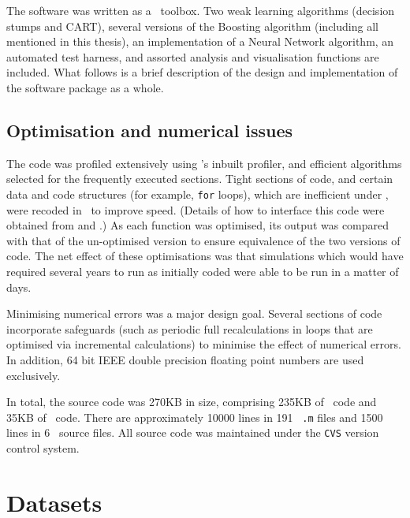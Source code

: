 The software was written as a \MATLAB\ toolbox.  Two weak learning
algorithms (decision stumps and CART), several versions of the
Boosting algorithm (including all mentioned in this thesis), an
implementation of a Neural Network algorithm, an automated test
harness, and assorted analysis and visualisation functions are
included.  What follows is a brief description of the design and
implementation of the software package as a whole.

\subsection{Optimisation and numerical issues}

The code was profiled extensively using \MATLAB's inbuilt profiler,
and efficient algorithms selected for the frequently executed
sections.  Tight sections of code, and certain data and code
structures (for example, {\tt for} loops), which are inefficient under
\MATLAB, were recoded in \C\ to improve speed.  (Details of how
to interface this code were obtained from \cite{MathWorks96} and
\cite{MathWorks96a}.) As each function was optimised, its output was
compared with that of the un-optimised version to ensure equivalence
of the two versions of code.  The net effect of these optimisations
was that simulations which would have required several years to run as
initially coded were able to be run in a matter of days.

Minimising numerical errors was a major design goal.  Several sections
of code incorporate safeguards (such as periodic full recalculations
in loops that are optimised via incremental calculations) to minimise the
effect of numerical errors.  In addition, 64 bit IEEE double precision
floating point numbers are used exclusively.

In total, the source code was 270KB in size, comprising 235KB of
\MATLAB\ code and 35KB of \C\ code.  There are approximately 10000
lines in 191 \MATLAB\ {\tt .m} files and 1500 lines in 6 \C\ source
files.  All source code was maintained under the {\tt CVS} version
control system.

\section{Datasets}

